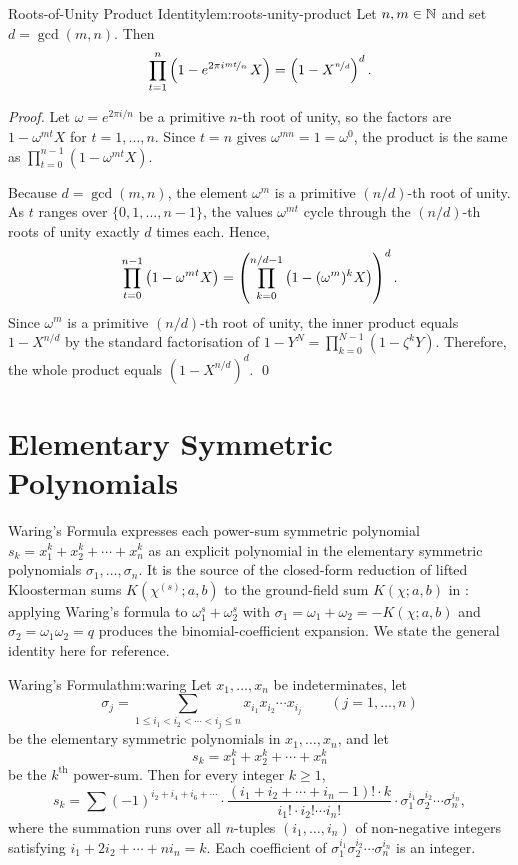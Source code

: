 \begin{lemma}{Roots-of-Unity Product Identity}{lem:roots-unity-product}
  Let $n,m\in\mathbb{N}$ and set $d=\gcd(m,n)$. Then
  $$\prod_{t=1}^{n}\left(1-e^{2\pi i\nicefrac{mt}{n}}\,X\right)=\left(1-X^{\nicefrac{n}{d}}\right)^{d}.$$
\end{lemma}
\begin{proof}
  Let $\omega=e^{2\pi i/n}$ be a primitive $n$-th root of unity, so the factors are $1-\omega^{mt}X$ for $t=1,\dots,n$. Since $t=n$ gives $\omega^{mn}=1=\omega^0$, the product is the same as $\prod_{t=0}^{n-1}(1-\omega^{mt}X)$.

  Because $d=\gcd(m,n)$, the element $\omega^m$ is a primitive $(n/d)$-th root of unity. As $t$ ranges over $\{0,1,\dots,n-1\}$, the values $\omega^{mt}$ cycle through the $(n/d)$-th roots of unity exactly $d$ times each. Hence,
  $$\prod_{t=0}^{n-1}\left(1-\omega^{mt}X\right)=\left(\prod_{k=0}^{n/d-1}\left(1-(\omega^m)^k X\right)\right)^d.$$
  Since $\omega^m$ is a primitive $(n/d)$-th root of unity, the inner product equals $1-X^{n/d}$ by the standard factorisation of $1-Y^N = \prod_{k=0}^{N-1}(1-\zeta^k Y)$. Therefore, the whole product equals $(1-X^{n/d})^d$. \qed
\end{proof}

\section{Elementary Symmetric Polynomials}
Waring's Formula expresses each power-sum symmetric polynomial $s_k=x_1^k+x_2^k+\cdots+x_n^k$ as an explicit polynomial in the elementary symmetric polynomials $\sigma_1,\dots,\sigma_n$. It is the source of the closed-form reduction of lifted Kloosterman sums $K(\chi^{(s)};a,b)$ to the ground-field sum $K(\chi;a,b)$ in : applying Waring's formula to $\omega_1^s+\omega_2^s$ with $\sigma_1=\omega_1+\omega_2=-K(\chi;a,b)$ and $\sigma_2=\omega_1\omega_2=q$ produces the binomial-coefficient expansion. We state the general identity here for reference.
\begin{Theorem}{Waring's Formula}{thm:waring}%
  Let $x_1,\dots,x_n$ be indeterminates, let $$\sigma_j=\sum_{1\leq i_1<i_2<\cdots<i_j\leq n}x_{i_1}x_{i_2}\cdots x_{i_j}\qquad (j=1,\dots,n)$$ be the elementary symmetric polynomials in $x_1,\dots,x_n$, and let $$s_k=x_1^k+x_2^k+\cdots+x_n^k$$ be the $k^{\text{th}}$ power-sum. Then for every integer $k\geq 1$,
  $$s_k=\sum(-1)^{i_2+i_4+i_6+\cdots}\cdot \frac{(i_1+i_2+\cdots+i_n-1)!\cdot k}{i_1!\cdot i_2!\cdots i_n!}\cdot \sigma_1^{i_1}\sigma_2^{i_2}\cdots \sigma_n^{i_n},$$
  where the summation runs over all $n$-tuples $(i_1,\dots,i_n)$ of non-negative integers satisfying $i_1+2i_2+\cdots+ni_n=k$. Each coefficient of $\sigma_1^{i_1}\sigma_2^{i_2}\cdots \sigma_n^{i_n}$ is an integer.
\end{Theorem}

